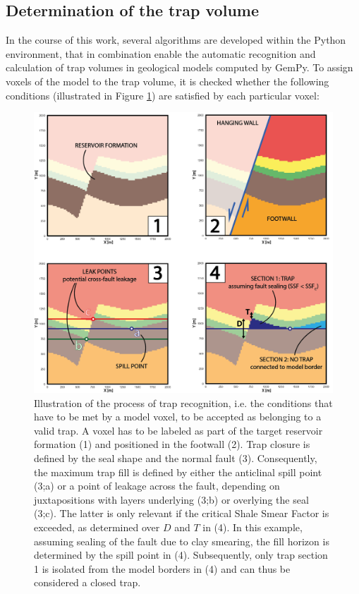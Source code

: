 		
		\subsection{Determination of the trap volume}
		In the course of this work, several algorithms are developed within the Python environment, that in combination enable the automatic recognition and calculation of trap volumes in geological models computed by GemPy. To assign voxels of the model to the trap volume, it is checked whether the following conditions (illustrated in Figure \ref{fig:trap_recognition}) are satisfied by each particular voxel: 
		\begin{figure}[p!]
			\centering
			\includegraphics[width=1\textwidth]{Figures/Trap_Cond_H.png}
			\caption{Illustration of the process of trap recognition, i.e. the conditions that have to be met by a model voxel, to be accepted as belonging to a valid trap. A voxel has to be labeled as part of the target reservoir formation (1) and positioned in the footwall (2). Trap closure is defined by the seal shape and the normal fault (3). Consequently, the maximum trap fill is defined by either the anticlinal spill point (3;a) or a point of leakage across the fault, depending on juxtapositions with layers underlying (3;b) or overlying the seal (3;c). The latter is only relevant if the critical Shale Smear Factor is exceeded, as determined over $D$ and $T$ in (4). In this example, assuming sealing of the fault due to clay smearing, the fill horizon is determined by the spill point in (4). Subsequently, only trap section 1 is isolated from the model borders in (4) and can thus be considered a closed trap.}\label{fig:trap_recognition}
		\end{figure}
